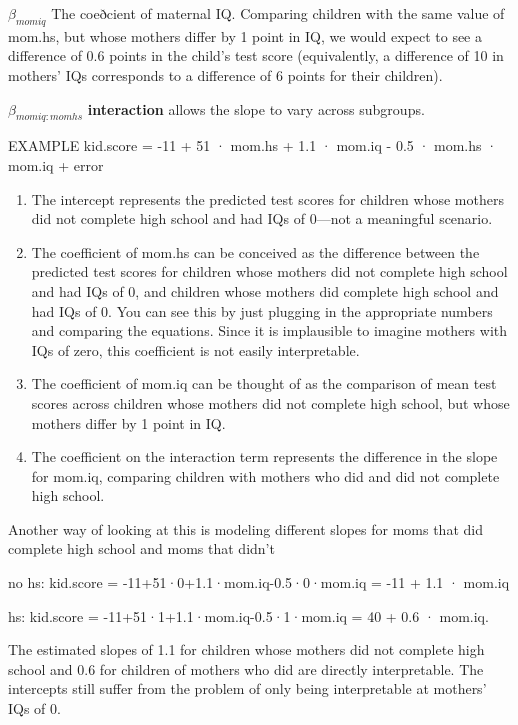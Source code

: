\documentclass[
]{article}
\begin{document}
\(\beta_{momiq}\) The coeðcient of maternal IQ. Comparing children with
the same value of mom.hs, but whose mothers differ by 1 point in IQ, we
would expect to see a difference of 0.6 points in the child's test score
(equivalently, a difference of 10 in mothers' IQs corresponds to a
difference of 6 points for their children).

\(\beta_{momiq:momhs}\) \textbf{interaction} allows the slope to vary
across subgroups.

EXAMPLE kid.score = -11 + 51 · mom.hs + 1.1 · mom.iq - 0.5 · mom.hs ·
mom.iq + error

\begin{enumerate}
\def\labelenumi{\arabic{enumi}.}
\item
  The intercept represents the predicted test scores for children whose
  mothers did not complete high school and had IQs of 0---not a
  meaningful scenario.
\item
  The coefficient of mom.hs can be conceived as the difference between
  the predicted test scores for children whose mothers did not complete
  high school and had IQs of 0, and children whose mothers did complete
  high school and had IQs of 0. You can see this by just plugging in the
  appropriate numbers and comparing the equations. Since it is
  implausible to imagine mothers with IQs of zero, this coefficient is
  not easily interpretable.
\item
  The coefficient of mom.iq can be thought of as the comparison of mean
  test scores across children whose mothers did not complete high
  school, but whose mothers differ by 1 point in IQ.
\item
  The coefficient on the interaction term represents the difference in
  the slope for mom.iq, comparing children with mothers who did and did
  not complete high school.
\end{enumerate}

Another way of looking at this is modeling different slopes for moms
that did complete high school and moms that didn't

no hs: kid.score = -11+51·0+1.1·mom.iq-0.5·0·mom.iq = -11 + 1.1 · mom.iq

hs: kid.score = -11+51·1+1.1·mom.iq-0.5·1·mom.iq = 40 + 0.6 · mom.iq.

The estimated slopes of 1.1 for children whose mothers did not complete
high school and 0.6 for children of mothers who did are directly
interpretable. The intercepts still suffer from the problem of only
being interpretable at mothers' IQs of 0.
\end{document}
